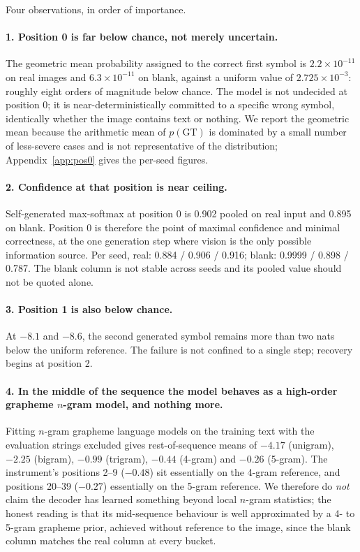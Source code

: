 \documentclass{article}
\begin{document}
Four observations, in order of importance.

\paragraph{1. Position 0 is far below chance, not merely uncertain.} The geometric mean
probability assigned to the correct first symbol is $2.2\times10^{-11}$ on real images and
$6.3\times10^{-11}$ on blank, against a uniform value of $2.725\times10^{-3}$: roughly eight
orders of magnitude below chance. The model is not undecided at position 0; it is
near-deterministically committed to a specific wrong symbol, identically whether the image
contains text or nothing. We report the geometric mean because the arithmetic mean of
$p(\mathrm{GT})$ is dominated by a small number of less-severe cases and is not representative
of the distribution; Appendix~\ref{app:pos0} gives the per-seed figures.

\paragraph{2. Confidence at that position is near ceiling.} Self-generated max-softmax at
position 0 is 0.902 pooled on real input and 0.895 on blank. Position 0 is therefore the point
of maximal confidence and minimal correctness, at the one generation step where vision is the
only possible information source. Per seed, real: 0.884 / 0.906 / 0.916; blank: 0.9999 / 0.898
/ 0.787. The blank column is not stable across seeds and its pooled value should not be quoted
alone.

\paragraph{3. Position 1 is also below chance.} At $-8.1$ and $-8.6$, the second generated
symbol remains more than two nats below the uniform reference. The failure is not confined to
a single step; recovery begins at position 2.

\paragraph{4. In the middle of the sequence the model behaves as a high-order grapheme
$n$-gram model, and nothing more.} Fitting $n$-gram grapheme language models on the training
text with the evaluation strings excluded gives rest-of-sequence means of $-4.17$ (unigram),
$-2.25$ (bigram), $-0.99$ (trigram), $-0.44$ (4-gram) and $-0.26$ (5-gram). The instrument's
positions 2--9 ($-0.48$) sit essentially on the 4-gram reference, and positions 20--39
($-0.27$) essentially on the 5-gram reference. We therefore do \emph{not} claim the decoder
has learned something beyond local $n$-gram statistics; the honest reading is that its
mid-sequence behaviour is well approximated by a 4- to 5-gram grapheme prior, achieved
without reference to the image, since the blank column matches the real column at every
bucket.
\end{document}
